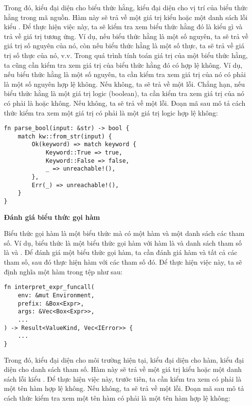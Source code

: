     Trong đó,  kiểu  đại diện cho biểu thức hằng,  kiểu  đại diện cho vị trí của biểu thức hằng trong mã nguồn. Hàm này sẽ trả về một giá trị kiểu  hoặc một danh sách lỗi kiểu . Để thực hiện việc này, ta sẽ kiểm tra xem biểu thức hằng đó là kiểu gì và trả về giá trị tương ứng. Ví dụ, nếu biểu thức hằng là một số nguyên, ta sẽ trả về giá trị số nguyên của nó, còn nếu biểu thức hằng là một số thực, ta sẽ trả về giá trị số thực của nó, v.v. Trong quá trình tính toán giá trị của một biểu thức hằng, ta cũng cần kiểm tra xem giá trị của biểu thức hằng đó có hợp lệ không. Ví dụ, nếu biểu thức hằng là một số nguyên, ta cần kiểm tra xem giá trị của nó có phải là một số nguyên hợp lệ không. Nếu không, ta sẽ trả về một lỗi. Chẳng hạn, nếu biểu thức hằng là một giá trị logic (boolean), ta cần kiểm tra xem giá trị của nó có phải là  hoặc  không. Nếu không, ta sẽ trả về một lỗi. Đoạn mã sau mô tả cách thức kiểm tra xem một giá trị có phải là một giá trị logic hợp lệ không:

\begin{lstlisting}[]
fn parse_bool(input: &str) -> bool {
    match kw::from_str(input) {
        Ok(keyword) => match keyword {
            Keyword::True => true,
            Keyword::False => false,
            _ => unreachable!(),
        },
        Err(_) => unreachable!(),
    }
}
\end{lstlisting}

\noindent \textbf{Đánh giá biểu thức gọi hàm}

    Biểu thức gọi hàm là một biểu thức mà có một hàm và một danh sách các tham số. Ví dụ, biểu thức  là một biểu thức gọi hàm với hàm là  và danh sách tham số là  và . Để đánh giá một biểu thức gọi hàm, ta cần đánh giá hàm và tất cả các tham số, sau đó thực hiện hàm với các tham số đó. Để thực hiện việc này, ta sẽ định nghĩa một hàm  trong tệp  như sau:

\begin{lstlisting}[]
fn interpret_expr_funcall(
    env: &mut Environment,
    prefix: &Box<Expr>,
    args: &Vec<Box<Expr>>,
    ...
) -> Result<ValueKind, Vec<IError>> {
    ...
}
\end{lstlisting}

    Trong đó,  kiểu  đại diện cho môi trường hiện tại,  kiểu  đại diện cho hàm,  kiểu  đại diện cho danh sách tham số. Hàm này sẽ trả về một giá trị kiểu  hoặc một danh sách lỗi kiểu . Để thực hiện việc này, trước tiên, ta cần kiểm tra xem  có phải là một tên hàm hợp lệ không. Nếu không, ta sẽ trả về một lỗi. Đoạn mã sau mô tả cách thức kiểm tra xem một tên hàm có phải là một tên hàm hợp lệ không:

